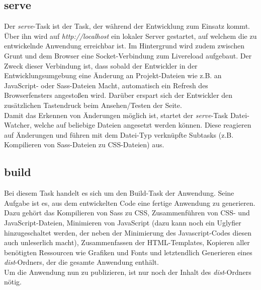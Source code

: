 \subsection{serve}
Der \textit{serve}-Task ist der Task, der während der Entwicklung zum Einsatz kommt. Über ihn wird auf \textit{http://localhost} ein lokaler Server gestartet, auf welchem
die zu entwickelnde Anwendung erreichbar ist. Im Hintergrund wird zudem zwischen Grunt und dem Browser eine Socket-Verbindung zum Livereload aufgebaut. Der Zweck dieser Verbindung ist,
dass sobald der Entwickler in der Entwicklungsumgebung eine Änderung an Projekt-Dateien wie z.B. an JavaScript- oder Sass-Dateien Macht, automatisch ein Refresh des Browserfensters angestoßen wird.
Darüber erspart sich der Entwickler den zusätzlichen Tastendruck beim Ansehen/Testen der Seite.\\
Damit das Erkennen von Änderungen möglich ist, startet der \textit{serve}-Task Datei-Watcher, welche auf beliebige Dateien angesetzt werden können. Diese reagieren auf Änderungen und führen mit dem Datei-Typ verknüpfte Subtasks (z.B. Kompilieren von Sass-Dateien zu CSS-Dateien) aus.

\subsection{build}
Bei diesem Task handelt es sich um den Build-Task der Anwendung. Seine Aufgabe ist es, aus dem entwickelten Code eine fertige Anwendung zu generieren.
Dazu gehört das Kompilieren von Sass zu CSS, Zusammenführen von CSS- und JavaScript-Dateien, Minimieren von JavaScript (dazu kann noch ein \glqq Uglyfier \grqq{} hinzugeschaltet werden, der neben der Minimierung des Javascript-Codes diesen auch unleserlich macht), Zusammenfassen der HTML-Templates, Kopieren aller benötigten Ressourcen wie Grafiken und Fonts und letztendlich Generieren eines \textit{dist}-Ordners, der die gesamte Anwendung enthält.\\
Um die Anwendung nun zu publizieren, ist nur noch der Inhalt des \textit{dist}-Ordners nötig.